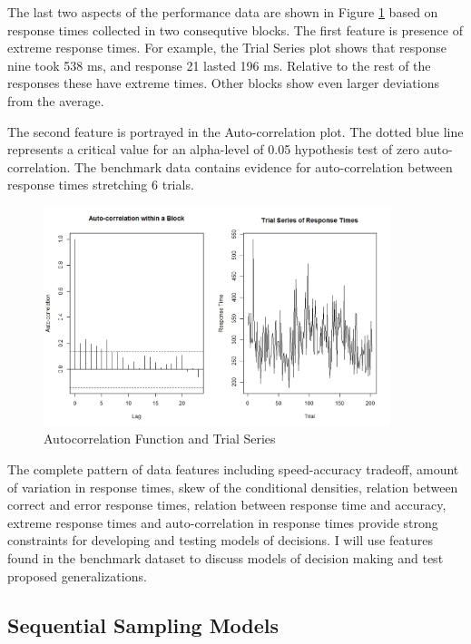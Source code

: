 \documentclass[12pt]{article}
\begin{document}
The last two aspects of the performance data are shown in Figure \ref{fig:autoacf} based on response times collected in two consequtive blocks. The first feature is presence of extreme response times. For example, the Trial Series plot shows that response nine took 538 ms, and response 21 lasted 196 ms. Relative to the rest of the responses these have extreme times. Other blocks show even larger deviations from the average.

The second feature is portrayed in the Auto-correlation plot. The dotted blue line represents a critical value for an alpha-level of 0.05 hypothesis test of zero auto-correlation. The benchmark data contains evidence for auto-correlation between response times stretching 6 trials. 
%
\begin{figure}
\centering
\includegraphics[width=0.9\textwidth]{Auto_Acf_RRdata}
\caption{Autocorrelation Function and Trial Series}
\label{fig:autoacf}
\end{figure}
%

The complete pattern of data features including speed-accuracy tradeoff, amount of variation in response times, skew of the conditional densities, relation between correct and error response times, relation between response time and accuracy, extreme response times and auto-correlation in response times provide strong constraints for developing and testing models of decisions. I will use features found in the benchmark dataset to discuss models of decision making and test proposed generalizations.

\subsection{Sequential Sampling Models}
\end{document}

